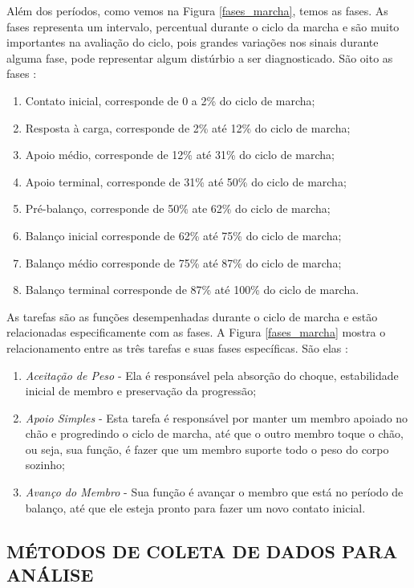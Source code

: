 Além dos períodos, como vemos na Figura \ref{fases_marcha}, temos as fases. As fases representa um intervalo, percentual durante o ciclo da marcha e são muito importantes na avaliação do ciclo, 
pois grandes variações nos sinais durante alguma fase, pode representar algum distúrbio a ser diagnosticado. São oito as fases \cite{Perry2010}:
\begin{enumerate}
	\item Contato inicial, corresponde de 0 a 2\% do ciclo de marcha;
	\item Resposta à carga, corresponde de 2\% até 12\% do ciclo de marcha;
	\item Apoio médio, corresponde de 12\% até 31\% do ciclo de marcha;
	\item Apoio terminal, corresponde de 31\% até 50\% do ciclo de marcha;
	\item Pré-balanço, corresponde de 50\% ate 62\% do ciclo de marcha;
	\item Balanço inicial corresponde de 62\% até 75\% do ciclo de marcha;
	\item Balanço médio corresponde de 75\% até 87\% do ciclo de marcha;
	\item Balanço terminal corresponde de 87\% até 100\% do ciclo de marcha. 
\end{enumerate}

As tarefas são as funções desempenhadas durante o ciclo de marcha e estão relacionadas especificamente com as fases. 
A Figura \ref{fases_marcha} mostra o relacionamento entre as três tarefas e suas fases específicas. São elas \cite{Perry2010}:
\begin{enumerate}
	\item \emph{Aceitação de Peso} - Ela é responsável pela absorção do choque, estabilidade inicial de membro e preservação da progressão;
	\item \emph{Apoio Simples} - Esta tarefa é responsável por manter um membro apoiado no chão e progredindo o ciclo de marcha, até que o outro membro toque o chão, ou seja, sua função, é fazer que um membro suporte todo o peso do corpo sozinho;
	\item \emph{Avanço do Membro} - Sua função é avançar o membro que está no período de balanço, até que ele esteja pronto para fazer um novo contato inicial.
\end{enumerate}

\subsection{MÉTODOS DE COLETA DE DADOS PARA ANÁLISE} 
\label{metodos_analise}

